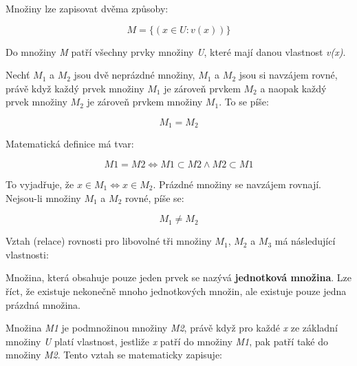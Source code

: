 
Množiny lze zapisovat dvěma způsoby:

\vskip 4mm

$$ M=\{ (x\in U: v(x)) \} $$

Do množiny {\it M} patří všechny prvky množiny {\it U}, které mají danou vlastnost {\it v(x)}.
\vskip 4mm


Nechť $M_1$ a $M_2$ jsou dvě neprázdné množiny, $M_1$ a $M_2$ jsou si navzájem rovné, právě když každý prvek množiny $M_1$ je zároveň prvkem $M_2$ a naopak každý prvek množiny $M_2$ je zároveň prvkem množiny $M_1$. To se píše:

$$ M_1 = M_2 $$

Matematická definice má tvar:

$$ M1 = M2 \Leftrightarrow M1 \subset M2 \wedge  M2 \subset M1  $$

To vyjadřuje, že $x \in M_1 \Leftrightarrow x \in M_2$. Prázdné množiny se navzájem rovnají. Nejsou-li množiny $M_1$ a $M_2$ rovné, píše se:

$$ M_1 \neq M_2 $$

Vztah (relace) rovnosti pro libovolné tři množiny $M_1$, $M_2$ a $M_3$ má následující vlastnosti:

\vskip 4mm
\vskip 4mm

Množina, která obsahuje pouze jeden prvek se nazývá {\bf jednotková množina}. Lze říct, že existuje nekonečně mnoho jednotkových množin, ale existuje pouze jedna prázdná množina. 


Množina {\it M1} je podmnožinou množiny {\it M2}, právě když pro každé {\it x} ze základní množiny {\it U} platí vlastnost, jestliže {\it x} patří do množiny  {\it M1}, pak patří také do množiny {\it M2}. Tento vztah se matematicky zapisuje:

